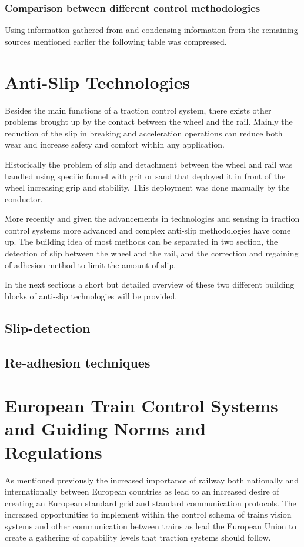 \subsubsection{Comparison between different control methodologies}
Using information gathered from \cite{MainSOTA} and condensing information from the remaining sources mentioned earlier the following table was compressed.

\section{Anti-Slip Technologies}
Besides the main functions of a traction control system, there exists other problems brought up by the contact between the wheel and the rail. Mainly the reduction of the slip in breaking and acceleration operations can reduce both wear and increase safety and comfort within any application. 

Historically the problem of slip and detachment between the wheel and rail was handled using specific funnel with grit or sand that deployed it in front of the wheel increasing grip and stability. This deployment was done manually by the conductor. 

More recently and given the advancements in technologies and sensing in traction control systems more advanced and complex anti-slip methodologies have come up. The building idea of most methods can be separated in two section, the detection of  slip between the wheel and the rail, and the correction and regaining of adhesion method to limit the amount of slip.

In the next sections a short but detailed overview of these two different building blocks of anti-slip technologies will be provided.
\subsection{Slip-detection}
\subsection{Re-adhesion techniques}

\section{European Train Control Systems and Guiding Norms and Regulations}
As mentioned previously the increased importance of railway both nationally and internationally between European countries as lead to an increased desire of creating an European standard grid and standard communication protocols. The increased opportunities to implement within the control schema of trains vision systems and other communication between trains as lead the European Union to create a gathering of capability levels that traction systems should follow.

